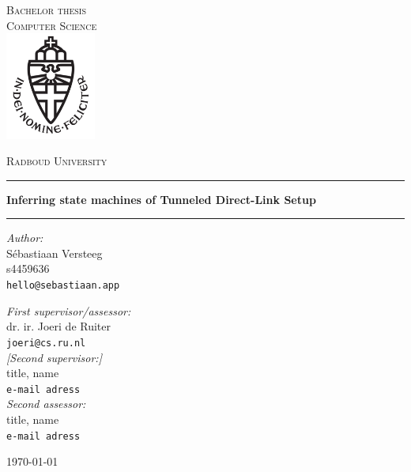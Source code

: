\documentclass[11pt,a4paper]{report}
\begin{document}
\begin{titlepage}
\begin{center}
\textsc{\LARGE Bachelor thesis\\Computer Science}\\[1.5cm]
\includegraphics[height=100pt]{logo}

\vspace{0.4cm}
\textsc{\Large Radboud University}\\[1cm]
\hrule
\vspace{0.4cm}
\textbf{\huge Inferring state machines of Tunneled Direct-Link Setup}\\[0.4cm]
\hrule
\vspace{2cm}
\begin{minipage}[t]{0.45\textwidth}
\begin{flushleft} \large
\textit{Author:}\\
S\'ebastiaan Versteeg\\
s4459636\\
\texttt{hello@sebastiaan.app}\\
\end{flushleft}
\end{minipage}
\begin{minipage}[t]{0.45\textwidth}
\begin{flushright} \large
\textit{First supervisor/assessor:}\\
dr. ir. Joeri de Ruiter\\
\texttt{joeri@cs.ru.nl}\\[1.3cm]
\textit{[Second supervisor:]}\\
title, name\\
\texttt{e-mail adress}\\[1.3cm]
\textit{Second assessor:}\\
title, name\\
\texttt{e-mail adress}
\end{flushright}
\end{minipage}
\vfill
{\large \today}
\end{center}
\end{titlepage}



\tableofcontents










\begin{appendices}

\end{appendices}
\end{document}
